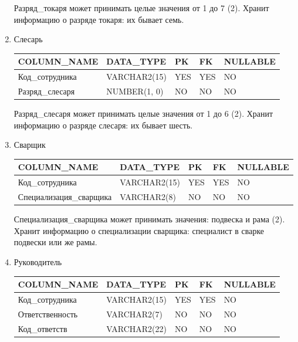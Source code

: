 \begin{enumerate}
\begin{tabular}{|p{7cm}|p{3cm}|p{1cm}|p{1cm}|p{3cm}|}
    \end{tabular}

    Разряд\_токаря может принимать целые значения от 1 до 7 (2).
    Хранит информацию о разряде токаря: их бывает семь.

    \item{Слесарь}

    \begin{tabular}{|p{7cm}|p{3cm}|p{1cm}|p{1cm}|p{3cm}|} \hline

        {\bf COLUMN\_NAME} & {\bf DATA\_TYPE} & {\bf PK} & {\bf FK} & {\bf NULLABLE} \\ \hline
        Код\_сотрудника & VARCHAR2(15) & YES & YES & NO \\ \hline
        Разряд\_слесаря & NUMBER(1, 0) & NO & NO & NO \\ \hline

    \end{tabular}

    Разряд\_слесаря может принимать целые значения от 1 до 6 (2).
    Хранит информацию о разряде слесаря: их бывает шесть.

    \item{Сварщик}

    \begin{tabular}{|p{7cm}|p{3cm}|p{1cm}|p{1cm}|p{3cm}|} \hline

        {\bf COLUMN\_NAME} & {\bf DATA\_TYPE} & {\bf PK} & {\bf FK} & {\bf NULLABLE} \\ \hline
        Код\_сотрудника & VARCHAR2(15) & YES & YES & NO \\ \hline
        Специализация\_сварщика & VARCHAR2(8) & NO & NO & NO \\ \hline

    \end{tabular}

    Специализация\_сварщика может принимать значения: подвеска и рама (2).
    Хранит информацию о специализации сварщика: специалист в сварке подвески или же рамы.

    \item{Руководитель}

    \begin{tabular}{|p{7cm}|p{3cm}|p{1cm}|p{1cm}|p{3cm}|} \hline

        {\bf COLUMN\_NAME} & {\bf DATA\_TYPE} & {\bf PK} & {\bf FK} & {\bf NULLABLE} \\ \hline
        Код\_сотрудника & VARCHAR2(15) & YES & YES & NO \\ \hline
        Ответственность & VARCHAR2(7) & NO & NO & NO \\ \hline
        Код\_ответств & VARCHAR2(22) & NO & NO & NO \\ \hline


\end{tabular}
\end{enumerate}
